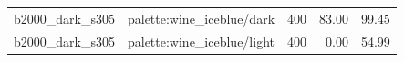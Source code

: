 \begin{longtable}{l>{\raggedright\arraybackslash}p{.42\linewidth}rrr}
b2000\_\allowbreak{}dark\_\allowbreak{}s305 & %
palette:wine\_\allowbreak{}iceblue/dark & %
400 & %
83.00 & %
99.45 \\ %

b2000\_\allowbreak{}dark\_\allowbreak{}s305 & %
palette:wine\_\allowbreak{}iceblue/light & %
400 & %
0.00 & %
54.99 \\ %


\end{longtable}
